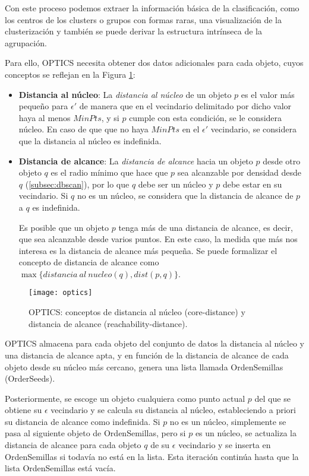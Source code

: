 \documentclass[10pt, a4paper]{article}
\begin{document}
Con este proceso podemos extraer la información básica de la clasificación, como los centros de los clusters o grupos con formas raras, una visualización de la clusterización y también se puede derivar la estructura intrínseca de la agrupación.

Para ello, OPTICS necesita obtener dos datos adicionales para cada objeto, cuyos conceptos se reflejan en la Figura \ref{fig:optics}:

\begin{itemize}
  \item \textbf{Distancia al núcleo}: La \textit{distancia al núcleo} de un objeto $p$ es el valor más pequeño para $\epsilon'$ de manera que en el vecindario delimitado por dicho valor haya al menos $MinPts$, y si $p$ cumple con esta condición, se le considera núcleo. En caso de que que no haya $MinPts$ en el $\epsilon'$ vecindario, se considera que la distancia al núcleo es indefinida.
  
  \item \textbf{Distancia de alcance}: La \textit{distancia de alcance} hacia un objeto $p$ desde otro objeto $q$ es el radio mínimo que hace que $p$ sea alcanzable por densidad desde $q$ (\ref{subsec:dbscan}), por lo que $q$ debe ser un núcleo y $p$ debe estar en su vecindario. Si $q$ no es un núcleo, se considera que la distancia de alcance de $p$ a $q$ es indefinida. 
  
  Es posible que un objeto $p$ tenga más de una distancia de alcance, es decir, que sea alcanzable desde varios puntos. En este caso, la medida que más nos interesa es la distancia de alcance más pequeña. Se puede formalizar el concepto de distancia de alcance como $\max\{distancia \ al \ nucleo(q), dist(p,q)\}$. 
\end{itemize}

\begin{figure}[ht]
\centering
\texttt{[image: optics]}
\caption{OPTICS: conceptos de distancia al núcleo (core-distance) y distancia de alcance (reachability-distance).}
\label{fig:optics}
\end{figure}

OPTICS almacena para cada objeto del conjunto de datos la distancia al núcleo y una distancia de alcance apta, y en función de la distancia de alcance de cada objeto desde su núcleo más cercano, genera una lista llamada OrdenSemillas (OrderSeeds). 

Posteriormente, se escoge un objeto cualquiera como punto actual $p$ del que se obtiene su $\epsilon$ vecindario y se calcula su distancia al núcleo, estableciendo a priori su distancia de alcance como indefinida. Si $p$ no es un núcleo, simplemente se pasa al siguiente objeto de OrdenSemillas, pero si $p$ es un núcleo, se actualiza la distancia de alcance para cada objeto $q$ de su $\epsilon$ vecindario y se inserta en OrdenSemillas si todavía no está en la lista. Esta iteración continúa hasta que la lista OrdenSemillas está vacía. 
\end{document}
